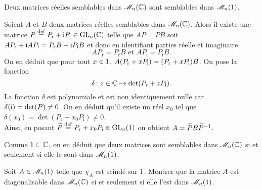 \begin{prop}
    Deux matrices réelles semblables dans $\M_n(\C)$ sont semblables dans $\M_n(\R)$.
\end{prop}

\begin{demo}
    Soient $A$ et $B$ deux matrices réelles semblables dans $\M_n(\C)$. Alors il existe une matrice $P \defeq P_{\mathrm{r}} + \i P_{\mathrm{i}} \in \Gl_n(\C)$ telle que $AP = PB$ soit $A P_{\mathrm{r}} + \i A P_{\mathrm{i}} = P_{\mathrm{r}} B + \i P_{\mathrm{i}} B$ et donc en identifiant parties réelle et imaginaire, $$A P_{\mathrm{r}} = P_{\mathrm{r}} B \text{ et } A P_{\mathrm{i}} = P_{\mathrm{i}} B.$$
    On en déduit que pour tout $x \in \R,\ A(P_{\mathrm{r}} + x P_{\mathrm{i}}) = (P_{\mathrm{r}} + x P_{\mathrm{i}})B$. On pose la fonction 
    $$\fonctionligne[\delta]{z \in \C}{\det(P_{\mathrm{r}} + z P_{\mathrm{i}})}.$$ 
    La fonction $\delta$ est polynomiale et est non identiquement nulle car $\delta(\i) = \det(P) \not=0$. On en déduit qu'il existe un réel $x_0$ tel que $\delta(x_0) = \det(P_{\mathrm{r}} + x_0 P_{\mathrm{i}}) \not=0$. \\
    Ainsi, en posant $\widetilde{P} \defeq P_{\mathrm{r}} + x_0 P_{\mathrm{i}} \in \Gl_n(\R)$ on obtient $A = \widetilde{P}B\Inv{\widetilde{P}}$.
\end{demo}

\begin{remarque}
    Comme $\R \subset \C$, on en déduit que deux matrices sont semblables dans $\M_n(\C)$ si et seulement si elle le sont dans $\M_n(\R)$.
\end{remarque}

\begin{exercice}
    Soit $A \in \M_n(\R)$ telle que $\chi_A$ est scindé sur $\R$. Montrer que la matrice $A$ est diagonalisable dans $\M_n(\C)$ si et seulement si elle l'est dans $\M_n(\R)$.
\end{exercice}